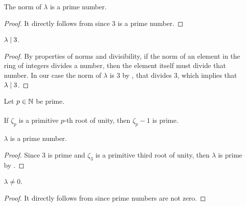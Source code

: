 \begin{lemma}
    \label{lmm:norm_lambda_prime}
    \leanok
    The norm of $\lambda$ is a prime number.
\end{lemma}
\begin{proof}
    \leanok
    It directly follows from  since $3$ is a prime number.
\end{proof}

\begin{lemma}
    \label{lmm:lambda_dvd_three}
    \leanok
    $\lambda \mid 3$.
\end{lemma}
\begin{proof}
    \leanok
    By properties of norms and divisibility, if the norm of an element in the ring of integers
    divides a number, then the element itself must divide that number.
    In our case the norm of $\lambda$ is $3$ by , that divides $3$,
    which implies that $\lambda \mid 3$.
\end{proof}

\begin{theorem}
    \label{thm:zeta_sub_one_prime1}
    \leanok
    Let $p \in \mathbb{N}$ be prime. \\\\
    If $\zeta_p$ is a primitive $p$-th root of unity, then $\zeta_p - 1$ is prime.
\end{theorem}

\begin{lemma}
    \label{lmm:lambda_prime}
    \leanok
    $\lambda$ is a prime number.
\end{lemma}
\begin{proof}
    \leanok
    Since $3$ is prime and $\zeta_3$ is a primitive third root of unity, then $\lambda$ is prime
    by .
\end{proof}

\begin{lemma}
    \label{lmm:lambda_ne_zero}
    \leanok
    $\lambda \neq 0$.
\end{lemma}
\begin{proof}
    \leanok
    It directly follows from  since prime numbers are not zero.
\end{proof}

